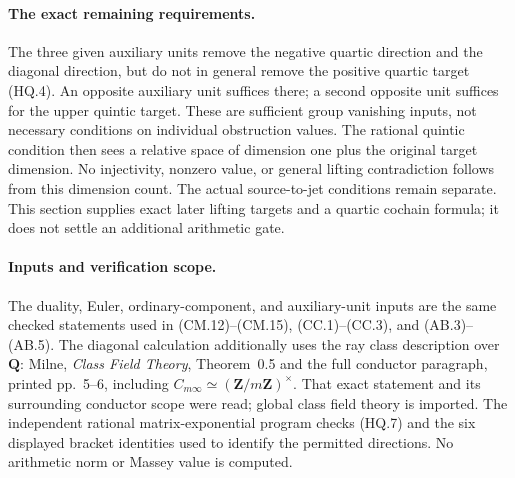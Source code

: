 \paragraph{The exact remaining requirements.}
The three given auxiliary units remove the negative
quartic direction and the diagonal direction, but
do not in general remove the positive quartic
target (HQ.4).  An opposite auxiliary unit suffices
there; a second opposite unit suffices for the
upper quintic target.  These are sufficient group
vanishing inputs, not necessary conditions on
individual obstruction values.  The rational
quintic condition then sees a relative space of
dimension one plus the original target dimension.
No injectivity, nonzero value, or general lifting
contradiction follows from this dimension count.
The actual source-to-jet conditions remain
separate.  This section supplies exact later
lifting targets and a quartic cochain formula;
it does not settle an additional arithmetic gate.

\paragraph{Inputs and verification scope.}
The duality, Euler, ordinary-component, and auxiliary-unit
inputs are the same checked statements used in
(CM.12)--(CM.15), (CC.1)--(CC.3), and (AB.3)--(AB.5).
The diagonal calculation additionally uses the ray class
description over \(\mathbf Q\): Milne,
\emph{Class Field Theory}, Theorem~0.5 and the full
conductor paragraph, printed pp.~5--6, including
\(C_{m\infty}\simeq(\mathbf Z/m\mathbf Z)^\times\).
That exact statement and its surrounding conductor
scope were read; global class field theory is imported.
The independent rational matrix-exponential program
checks (HQ.7) and the six displayed bracket identities
used to identify the permitted directions.
No arithmetic norm or Massey value is computed.
